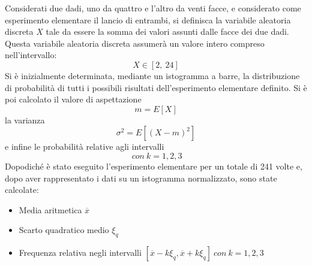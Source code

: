 Considerati due dadi, uno da quattro e l'altro da venti facce, e considerato come esperimento elementare il lancio di entrambi, si definisca la variabile aleatoria discreta $X$ tale da essere la somma dei valori assunti dalle facce dei due dadi. Questa variabile aleatoria discreta assumerà un valore intero compreso nell'intervallo:
\begin{equation}
	X\in[2,\ 24]
\end{equation}
Si è inizialmente determinata, mediante un istogramma a barre, la distribuzione di probabilità di tutti i possibili risultati dell'esperimento elementare definito. Si è poi calcolato il valore di aspettazione
\begin{equation}
	m=E[X]
\end{equation}
la varianza
\begin{equation}
	\sigma ^2=E[(X-m)^2]
\end{equation}
e infine le probabilità relative agli intervalli
\begin{equation}
	[m-k\sigma, m+k\sigma]\ con\ k=1,2,3
\end{equation} 
Dopodiché è stato eseguito l'esperimento elementare per un totale di 241 volte e, dopo aver rappresentato i dati su un istogramma normalizzato, sono state calcolate:
\begin{itemize}
	\item Media aritmetica $\overline{x}$ 
	\item Scarto quadratico medio $\xi_q$
	\item Frequenza relativa negli intervalli $[\overline{x}-k\xi_q, \overline{x}+k\xi_q]\ con\ k=1,2,3$
\end{itemize}